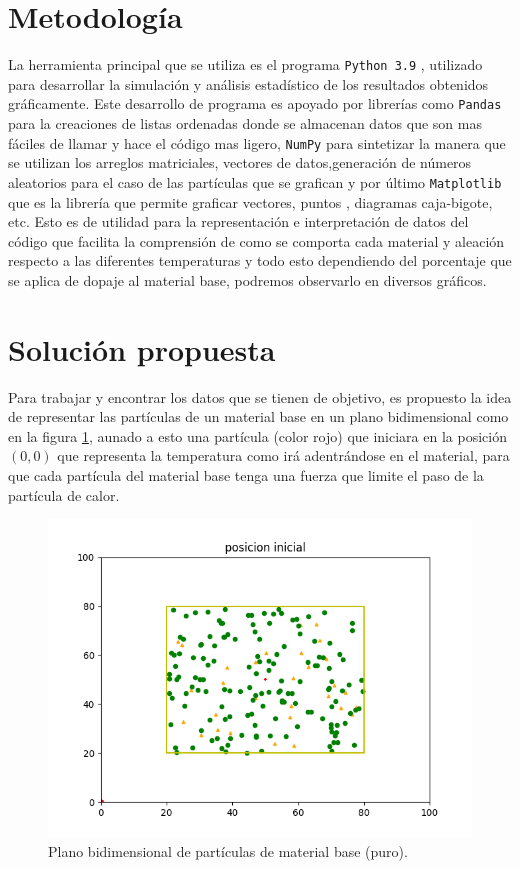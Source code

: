 \documentclass[3pt,twocolumn]{elsarticle}
\begin{document}
\section{Metodología}
La herramienta principal que se utiliza es el programa \texttt{Python 3.9} \cite{Python}, utilizado para desarrollar la simulación y análisis estadístico de los resultados obtenidos gráficamente.
Este desarrollo de programa es apoyado por librerías como \texttt{Pandas} \cite{pandas} para la creaciones de listas ordenadas donde se almacenan datos que son mas fáciles de llamar y hace el código mas ligero, \texttt{NumPy} \cite{numpy} para sintetizar la manera que se utilizan los arreglos matriciales, vectores de datos,generación de números aleatorios para el caso de las partículas que se grafican y por último \texttt{Matplotlib} \cite{matplot} que es la librería que permite graficar vectores, puntos , diagramas caja-bigote, etc. Esto es de utilidad para la representación e interpretación de datos del código que facilita la comprensión de como se comporta cada material y aleación respecto a las diferentes temperaturas y todo esto dependiendo del porcentaje que se aplica de dopaje al material base, podremos observarlo en diversos gráficos.

\section{Solución propuesta }\label{intr}
Para trabajar y encontrar los datos que se tienen de objetivo, es propuesto la idea de representar las partículas de un material base en un plano bidimensional como en la figura \ref{f2}, aunado a esto una partícula (color rojo) que iniciara en la posición \texttt{$(0,0)$} que representa la temperatura como irá adentrándose en el material, para que cada partícula del material base tenga una fuerza que limite el paso de la partícula de calor.

\begin{figure}[H]
  \centering      
  \includegraphics[width=\columnwidth]{p_inicial.png}
  \caption{Plano bidimensional de partículas de material base (puro).}
  \label{f2}
\end{figure}
\bigskip
\end{document}
